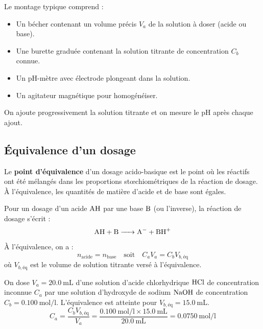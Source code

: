 \begin{experience}
Le montage typique comprend :
\begin{itemize}
    \item Un bécher contenant un volume précis $V_a$ de la solution à doser (acide ou base).
    \item Une burette graduée contenant la solution titrante de concentration $C_b$ connue.
    \item Un pH-mètre avec électrode plongeant dans la solution.
    \item Un agitateur magnétique pour homogénéiser.
\end{itemize}
On ajoute progressivement la solution titrante et on mesure le pH après chaque ajout.
\end{experience}

\subsection{Équivalence d'un dosage}

\begin{definition}
Le \textbf{point d'équivalence} d'un dosage acido-basique est le point où les réactifs ont été mélangés dans les proportions stœchiométriques de la réaction de dosage. À l'équivalence, les quantités de matière d'acide et de base sont égales.
\end{definition}

\begin{loi}
Pour un dosage d'un acide $\ce{AH}$ par une base $\ce{B}$ (ou l'inverse), la réaction de dosage s'écrit :
\[\ce{AH + B -> A- + BH+}\]
À l'équivalence, on a :
\[n_{\text{acide}} = n_{\text{base}} \quad \text{soit} \quad C_a V_a = C_b V_{b,\text{éq}}\]
où $V_{b,\text{éq}}$ est le volume de solution titrante versé à l'équivalence.
\end{loi}

\begin{exemple}
On dose $V_a = \SI{20,0}{\mL}$ d'une solution d'acide chlorhydrique $\ce{HCl}$ de concentration inconnue $C_a$ par une solution d'hydroxyde de sodium $\ce{NaOH}$ de concentration $C_b = \SI{0,100}{\mol\per\litre}$. L'équivalence est atteinte pour $V_{b,\text{éq}} = \SI{15,0}{\mL}$.
\[C_a = \frac{C_b V_{b,\text{éq}}}{V_a} = \frac{\SI{0,100}{\mol\per\litre} \times \SI{15,0}{\mL}}{\SI{20,0}{\mL}} = \SI{0,0750}{\mol\per\litre}\]
\end{exemple}


